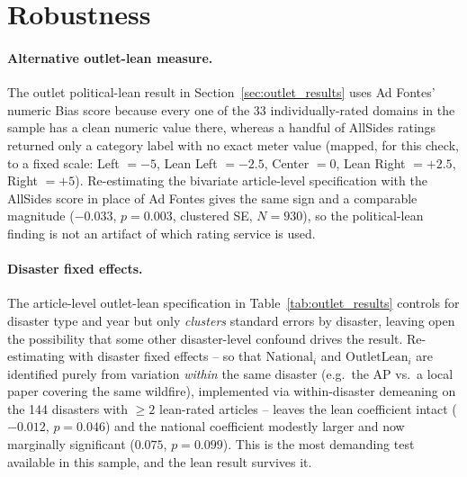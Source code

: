 \documentclass[12pt]{article}
\begin{document}
\FloatBarrier
\section{Robustness}
\label{sec:results_robustness}

\paragraph{Alternative outlet-lean measure.} The outlet political-lean
result in Section~\ref{sec:outlet_results} uses Ad Fontes' numeric Bias
score because every one of the 33 individually-rated domains in the sample
has a clean numeric value there, whereas a handful of AllSides ratings
returned only a category label with no exact meter value (mapped, for this
check, to a fixed scale: Left $=-5$, Lean Left $=-2.5$, Center $=0$, Lean
Right $=+2.5$, Right $=+5$). Re-estimating the bivariate article-level
specification with the AllSides score in place of Ad Fontes gives the same
sign and a comparable magnitude ($-0.033$, $p=0.003$, clustered SE,
$N=930$), so the political-lean finding is not an artifact of which rating
service is used.

\paragraph{Disaster fixed effects.} The article-level outlet-lean
specification in Table~\ref{tab:outlet_results} controls for disaster type
and year but only \emph{clusters} standard errors by disaster, leaving
open the possibility that some other disaster-level confound drives the
result. Re-estimating with disaster fixed effects -- so that
$\text{National}_i$ and $\text{OutletLean}_i$ are identified purely from
variation \emph{within} the same disaster (e.g.\ the AP vs.\ a local paper
covering the same wildfire), implemented via within-disaster demeaning on
the 144 disasters with $\geq 2$ lean-rated articles -- leaves the lean
coefficient intact ($-0.012$, $p=0.046$) and the national coefficient
modestly larger and now marginally significant ($0.075$, $p=0.099$). This
is the most demanding test available in this sample, and the lean result
survives it.
\end{document}
